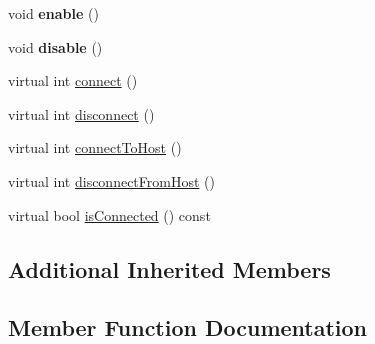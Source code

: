\begin{DoxyCompactItemize}
\item 
\mbox{\label{classathome_1_1communication_1_1wifi_1_1_e_s_p8266_wi_fi_communicator_af51040a77a72236bac1b7da51a609506}} 
void {\bfseries enable} ()
\item 
\mbox{\label{classathome_1_1communication_1_1wifi_1_1_e_s_p8266_wi_fi_communicator_a5f78b62392cf22fe115baaa7adaa37f2}} 
void {\bfseries disable} ()
\item 
virtual int \mbox{\hyperlink{classathome_1_1communication_1_1wifi_1_1_e_s_p8266_wi_fi_communicator_a58cc439be2f368b346bbbe1601a9b675}{connect}} ()
\item 
virtual int \mbox{\hyperlink{classathome_1_1communication_1_1wifi_1_1_e_s_p8266_wi_fi_communicator_a7e53e10b858aebc5e7c6c0ea6007f84a}{disconnect}} ()
\item 
virtual int \mbox{\hyperlink{classathome_1_1communication_1_1wifi_1_1_e_s_p8266_wi_fi_communicator_a159a93b350df135daa967665c9e53e2f}{connect\+To\+Host}} ()
\item 
virtual int \mbox{\hyperlink{classathome_1_1communication_1_1wifi_1_1_e_s_p8266_wi_fi_communicator_a0f8adbe1b1d219148c4f340980056356}{disconnect\+From\+Host}} ()
\item 
virtual bool \mbox{\hyperlink{classathome_1_1communication_1_1wifi_1_1_e_s_p8266_wi_fi_communicator_aefadac9b1a67d52853495dfabecad5fd}{is\+Connected}} () const
\end{DoxyCompactItemize}
\subsection*{Additional Inherited Members}


\subsection{Member Function Documentation}
\mbox{\label{classathome_1_1communication_1_1wifi_1_1_e_s_p8266_wi_fi_communicator_af9b1e28910959893748763faaa5373a0}} 
